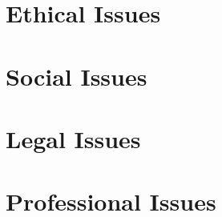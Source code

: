\section{Ethical Issues}
\label{ethical_issues}


\section{Social Issues}
\label{social_issues}


\section{Legal Issues}
\label{legal_issues}


\section{Professional Issues}
\label{professional_issues}


